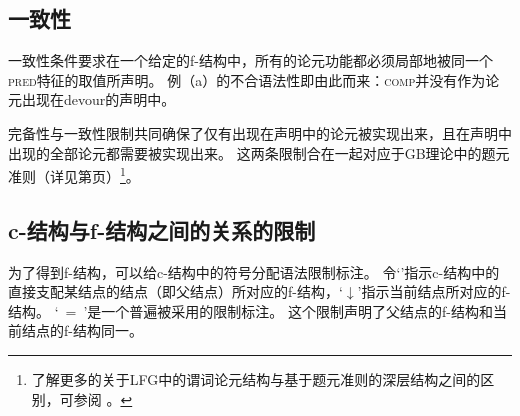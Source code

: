 \subsection{一致性}

一致性条件要求在一个给定的f-结构中，所有的论元功能都必须局部地被同一个\textsc{pred}特征的取值所声明。
例（a）的不合语法性即由此而来：\textsc{comp}并没有作为论元出现在devour的声明中。

\eal
{}
\zl

\noindent
完备性与一致性限制共同确保了仅有出现在\pred 声明中的论元被实现出来，且在\pred 声明中出现的全部论元都需要被实现出来。
这两条限制合在一起对应于GB理论中的题元准则（详见第\pageref{theta-Kriterium}页）\footnote{%
了解更多的关于LFG中的谓词论元结构与基于题元准则的深层结构之间的区别，可参阅 。
}。


\subsection{c-结构与f-结构之间的关系的限制}  

为了得到f-结构，可以给c-结构中的符号分配语法限制标注。
令`\up'\isc{$\uparrow$}\is{$\uparrow$}指示c-结构中的直接支配某结点的结点（即父结点）所对应的f-结构，`$\downarrow$'\isc{$\downarrow$}\is{$\downarrow$}指示当前结点所对应的f-结构。
`\up~=~\down'是一个普遍被采用的限制标注。
这个限制声明了父结点的f-结构和当前结点的f-结构同一。

